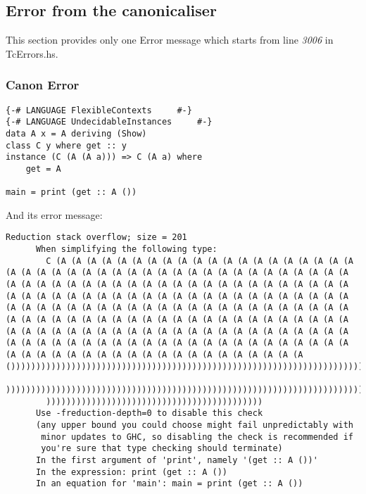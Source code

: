 \documentclass[a4paper]{article}
\begin{document}
\pagebreak
\subsection{Error from the canonicaliser}

This section provides only one Error message which starts from line \textit{3006} in TcErrors.hs. 

\subsubsection{Canon Error}


\begin{lstlisting}[label={lst: T??.0}, numbers=none, caption={Example Program \cite{ex100}}]
{-# LANGUAGE FlexibleContexts     #-}
{-# LANGUAGE UndecidableInstances     #-}
data A x = A deriving (Show)
class C y where get :: y
instance (C (A (A a))) => C (A a) where
    get = A

main = print (get :: A ())
\end{lstlisting}

And its error message:

\begin{lstlisting}[label={lst: T??.0.2}, numbers=none, caption={Error}]
 Reduction stack overflow; size = 201
      When simplifying the following type:
        C (A (A (A (A (A (A (A (A (A (A (A (A (A (A (A (A (A (A (A (A (A (A (A (A (A (A (A (A (A (A (A (A (A (A (A (A (A (A (A (A (A (A (A (A (A (A (A (A (A (A (A (A (A (A (A (A (A (A (A (A (A (A (A (A (A (A (A (A (A (A (A (A (A (A (A (A (A (A (A (A (A (A (A (A (A (A (A (A (A (A (A (A (A (A (A (A (A (A (A (A (A (A (A (A (A (A (A (A (A (A (A (A (A (A (A (A (A (A (A (A (A (A (A (A (A (A (A (A (A (A (A (A (A (A (A (A (A (A (A (A (A (A (A (A (A (A (A (A (A (A (A (A (A (A (A (A (A (A (A (A (A (A (A (A (A (A (A (A (A (A (A (A (A (A (A (A (A (A (A (A (A (A (A (A (A (A (A (A (A (A (A (A (A (A (A (A (A (A (A (A (A ()))))))))))))))))))))))))))))))))))))))))))))))))))))))))))))))))))))))))))))))))))
        ))))))))))))))))))))))))))))))))))))))))))))))))))))))))))))))))))))))))))))
        )))))))))))))))))))))))))))))))))))))))))))
      Use -freduction-depth=0 to disable this check
      (any upper bound you could choose might fail unpredictably with
       minor updates to GHC, so disabling the check is recommended if
       you're sure that type checking should terminate)
      In the first argument of 'print', namely '(get :: A ())'
      In the expression: print (get :: A ())
      In an equation for 'main': main = print (get :: A ())

\end{lstlisting}
\end{document}
